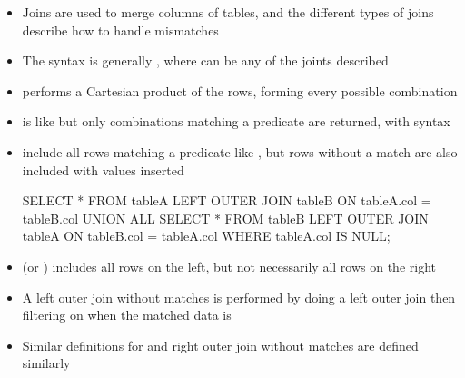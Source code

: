 \documentclass[a4paper]{article}
\begin{document}
\begin{itemize}
    \item Joins are used to merge columns of tables, and the different types of joins describe how to handle mismatches
    \item The syntax is generally , where  can be any of the joints described
    \item {} performs a Cartesian product of the rows, forming every possible combination
    \item {} is like  but only combinations matching a predicate are returned, with syntax 
    \item {} include all rows matching a predicate like , but rows without a match are also included with  values inserted
\begin{sql}
SELECT * FROM tableA
LEFT OUTER JOIN tableB
ON tableA.col = tableB.col
UNION ALL
SELECT * FROM tableB
LEFT OUTER JOIN tableA
ON tableB.col = tableA.col
WHERE tableA.col IS NULL;
\end{sql}
    \item {} (or ) includes all rows on the left, but not necessarily all rows on the right
    \item A left outer join without matches is performed by doing a left outer join then filtering on when the matched data is 
    \item Similar definitions for  and right outer join without matches are defined similarly

\end{itemize}
\end{document}
